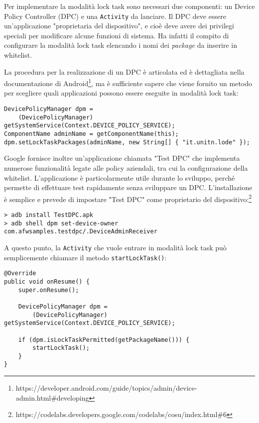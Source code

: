 Per implementare la modalità lock task sono necessari due componenti: un Device Policy Controller (DPC) e una \texttt{Activity} da lanciare. Il DPC deve essere un'applicazione "proprietaria del dispositivo", e cioè deve avere dei privilegi speciali per modificare alcune funzioni di sistema. Ha infatti il compito di configurare la modalità lock task elencando i nomi dei \emph{package} da inserire in whitelist.

La procedura per la realizzazione di un DPC è articolata ed è dettagliata nella documentazione di Android\footnote{https://developer.android.com/guide/topics/admin/device-admin.html\#developing}, ma è sufficiente sapere che viene fornito un metodo per scegliere quali applicazioni possono essere eseguite in modalità lock task:

\begin{verbatim}
DevicePolicyManager dpm =
    (DevicePolicyManager) getSystemService(Context.DEVICE_POLICY_SERVICE);
ComponentName adminName = getComponentName(this);
dpm.setLockTaskPackages(adminName, new String[] { "it.unitn.lode" });
\end{verbatim}

Google fornisce inoltre un'applicazione chiamata "Test DPC" che implementa numerose funzionalità legate alle policy aziendali, tra cui la configurazione della whitelist. L'applicazione è particolarmente utile durante lo sviluppo, perché permette di effettuare test rapidamente senza sviluppare un DPC. L'installazione è semplice e prevede di impostare "Test DPC" come proprietario del dispositivo:\footnote{https://codelabs.developers.google.com/codelabs/cosu/index.html\#6}

\begin{verbatim}
> adb install TestDPC.apk
> adb shell dpm set-device-owner com.afwsamples.testdpc/.DeviceAdminReceiver
\end{verbatim}

A questo punto, la \texttt{Activity} che vuole entrare in modalità lock task può semplicemente chiamare il metodo \texttt{startLockTask()}:

\begin{verbatim}
@Override
public void onResume() {
    super.onResume();
    
    DevicePolicyManager dpm =
        (DevicePolicyManager) getSystemService(Context.DEVICE_POLICY_SERVICE);

    if (dpm.isLockTaskPermitted(getPackageName())) {
        startLockTask();
    }
}
\end{verbatim}

